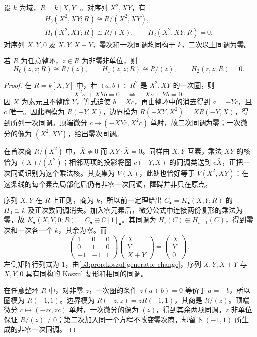 \begin{proposition}\label{b3:prop:koszul-obstruction-examples}
	设 \(k\) 为域，\(R=k[X,Y]\)。对序列 \(X^2,XY\)，有
	\[
		\begin{gathered}
			H_0(X^2,XY;R)\cong R/(X^2,XY),\\
			H_1(X^2,XY;R)\cong R/(X),\qquad H_2(X^2,XY;R)=0.
		\end{gathered}
	\]
	对序列 \(X,Y,0\) 及 \(X,Y,X+Y\)，零次和一次同调均同构于 \(k\)，二次以上同调为零。

	若 \(R\) 为任意整环，\(z\in R\) 为非零非单位，则
	\[
		H_0(z,z;R)\cong R/(z),\qquad H_1(z,z;R)\cong R/(z),\qquad H_2(z,z;R)=0.
	\]
\end{proposition}
\begin{proof}
	在 \(R=k[X,Y]\) 中，若 \((a,b)\in R^2\) 是 \(X^2,XY\) 的一次圈，则
	\[
		X^2a+XYb=0\quad\Longleftrightarrow\quad Xa+Yb=0.
	\]
	因 \(X\) 为素元且不整除 \(Y\)，等式迫使 \(b=Xc\)，再由整环中的消去得到 \(a=-Yc\)，且 \(c\) 唯一。因此圈模为 \(R(-Y,X)\)，边界模为 \(R(-XY,X^2)=XR(-Y,X)\)，得到所列一次同调。顶端微分 \(c\mapsto(-XYc,X^2c)\) 单射，故二次同调为零；一次微分的像为 \((X^2,XY)\)，给出零次同调。

	在首次商 \(R/(X^2)\) 中，\(\bar X\ne0\) 而 \(XY\cdot\bar X=0\)。同样由 \(X,Y\) 互素，乘法 \(XY\) 的核恰为 \((X)/(X^2)\)；相邻两项的投影将圈 \(c(-Y,X)\) 的同调类送到 \(c\bar X\)，正把一次同调识别为这个乘法核。其支集为 \(V(X)\)，此处也恰好等于 \(V(X^2,XY)\)：在这条线的每个素点局部化后仍有非零一次同调，障碍并非只在原点。

	序列 \(X,Y\) 在 \(R\) 上正则，商为 \(k\)，所以前一定理给出 \(C_\bullet=K_\bullet(X,Y;R)\) 的 \(H_0\cong k\) 及正次数同调消失。加入零元素后，微分公式中连接两份复形的乘法为零，故 \(K_\bullet(X,Y,0;R)=C_\bullet\oplus C[1]_\bullet\)。其同调为 \(H_i(C)\oplus H_{i-1}(C)\)，得到零次和一次各一个 \(k\)，其余为零。而
	\[
		\begin{pmatrix}1&0&0\\0&1&0\\-1&-1&1\end{pmatrix}
		\begin{pmatrix}X\\Y\\X+Y\end{pmatrix}
		=\begin{pmatrix}X\\Y\\0\end{pmatrix}.
	\]
	左侧矩阵行列式为 \(1\)，由\cref{b3:prop:koszul-generator-change}，序列 \(X,Y,X+Y\) 与 \(X,Y,0\) 具有同构的 Koszul 复形和相同的同调。

	在任意整环 \(R\) 中，对非零 \(z\)，一次圈的条件 \(z(a+b)=0\) 等价于 \(a=-b\)，所以圈模为 \(R(-1,1)\)。边界模为 \(R(-z,z)=zR(-1,1)\)，其商是 \(R/(z)\)。顶端微分 \(c\mapsto(-zc,zc)\) 单射，一次微分的像为 \((z)\)，得到其余两项同调。\(z\) 非单位保证 \(R/(z)\ne0\)；第二次加入同一个方程不改变零次商，却留下 \((-1,1)\) 所生成的非零一次同调。
\end{proof}
